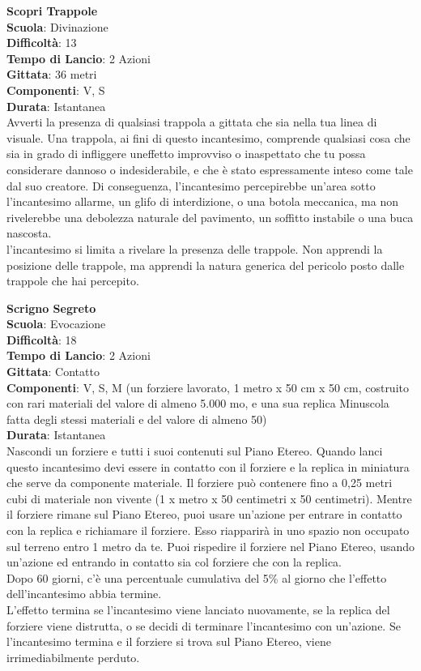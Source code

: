 \begin{multicols}{2}
\medskip\textbf{Scopri Trappole}\\
\textbf{Scuola}: Divinazione\\
\textbf{Difficoltà}:  13\\
\textbf{Tempo di Lancio}: 2 Azioni\\
\textbf{Gittata}: 36 metri\\
\textbf{Componenti}: V, S\\
\textbf{Durata}: Istantanea\\
Avverti la presenza di qualsiasi trappola a gittata che sia nella tua linea di visuale. Una trappola, ai fini di questo incantesimo, comprende qualsiasi cosa che sia in grado di infliggere uneffetto improvviso o inaspettato  che tu possa considerare dannoso o indesiderabile, e che è stato espressamente inteso come tale dal suo creatore. Di conseguenza, l'incantesimo percepirebbe un'area sotto l'incantesimo allarme, un glifo di interdizione, o una botola meccanica, ma non rivelerebbe una debolezza naturale del pavimento, un soffitto instabile o una buca nascosta.\\
l'incantesimo si limita a rivelare la presenza delle trappole. Non apprendi la posizione delle trappole, ma apprendi la natura generica del pericolo posto dalle trappole che hai percepito.

\medskip\textbf{Scrigno Segreto}\\
\textbf{Scuola}: Evocazione\\
\textbf{Difficoltà}:  18\\
\textbf{Tempo di Lancio}: 2 Azioni\\
\textbf{Gittata}: Contatto\\
\textbf{Componenti}: V, S, M (un forziere lavorato, 1 metro x 50 cm x 50 cm, costruito con rari materiali del valore di almeno 5.000 mo, e una sua replica Minuscola fatta degli stessi materiali e del valore di almeno 50) \\
\textbf{Durata}: Istantanea\\
Nascondi un forziere e tutti i suoi contenuti sul Piano Etereo. Quando lanci questo incantesimo devi essere in contatto con il forziere e la replica in miniatura che serve da componente materiale. Il forziere può contenere fino a 0,25 metri cubi di materiale non vivente (1 x metro x 50 centimetri x 50 centimetri). Mentre il forziere rimane sul Piano Etereo, puoi usare un'azione per entrare in contatto con la replica e richiamare il forziere. Esso riapparirà in uno spazio non occupato sul terreno entro 1 metro da te. Puoi rispedire il forziere nel Piano Etereo, usando un'azione ed entrando in contatto sia col forziere che con la replica.\\
Dopo 60 giorni, c’è una percentuale cumulativa del 5\% al giorno che l’effetto dell'incantesimo abbia termine. \\
L’effetto termina se l'incantesimo viene lanciato nuovamente, se la replica del forziere viene distrutta, o se decidi di terminare l'incantesimo con un'azione. Se l'incantesimo termina e il forziere si trova sul Piano Etereo, viene irrimediabilmente perduto.


\end{multicols}
